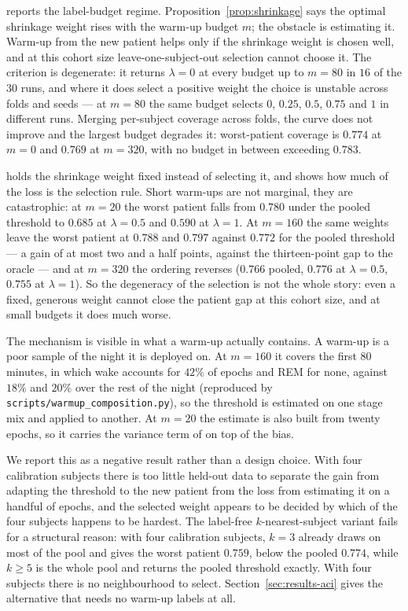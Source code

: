  reports the label-budget regime.
Proposition~\ref{prop:shrinkage} says the optimal shrinkage weight rises with
the warm-up budget $m$; the obstacle is estimating it. Warm-up from the new
patient helps only if the shrinkage weight is chosen well, and at this cohort
size leave-one-subject-out selection cannot choose it. The criterion is
degenerate: it returns $\lambda=0$ at every budget up to $m=80$ in
$16$ of the $30$ runs, and where it does select a positive weight the choice
is unstable across folds and seeds --- at $m=80$ the same budget selects $0$,
$0.25$, $0.5$, $0.75$ and $1$ in different runs. Merging per-subject coverage
across folds, the curve does not improve and the largest budget degrades it:
worst-patient coverage is $0.774$ at $m=0$ and $0.769$ at $m=320$, with no
budget in between exceeding $0.783$.

 holds the shrinkage weight fixed instead of selecting
it, and shows how much of the loss is the selection rule. Short warm-ups are
not marginal, they are catastrophic: at $m=20$ the worst patient falls from
$0.780$ under the pooled threshold to $0.685$ at $\lambda=0.5$ and $0.590$ at
$\lambda=1$. At $m=160$ the same weights leave the worst patient at $0.788$
and $0.797$ against $0.772$ for the pooled threshold --- a gain of at most two
and a half points, against the thirteen-point gap to the oracle --- and at
$m=320$ the ordering reverses ($0.766$ pooled, $0.776$ at $\lambda=0.5$,
$0.755$ at $\lambda=1$). So the degeneracy of the selection is not the whole
story: even a fixed, generous weight cannot close the patient gap at this
cohort size, and at small budgets it does much worse.

The mechanism is visible in what a warm-up actually contains. A warm-up is a
poor sample of the night it is deployed on.
At $m=160$ it covers the first $80$ minutes, in which wake accounts for
$42\%$ of epochs and REM for none, against $18\%$ and $20\%$ over the rest of
the night (reproduced by \texttt{scripts/warmup\_composition.py}), so the
threshold is estimated on one stage mix and applied to another. At $m=20$ the
estimate is also built from twenty epochs, so it carries the variance term of
 on top of the bias.



We report this as a negative result rather than a design choice. With four
calibration subjects there is too little held-out data to separate the gain
from adapting the threshold to the new patient from the loss from estimating
it on a handful of epochs, and the selected weight appears to be decided by
which of the four subjects happens to be hardest. The label-free
$k$-nearest-subject variant fails for a structural reason: with four
calibration subjects, $k=3$ already draws on most of the pool and gives the
worst patient $0.759$, below the pooled $0.774$, while $k\ge5$ is the whole
pool and returns the pooled threshold exactly. With four subjects there is
no neighbourhood to select. Section~\ref{sec:results-aci} gives the alternative
that needs no warm-up labels at all.

